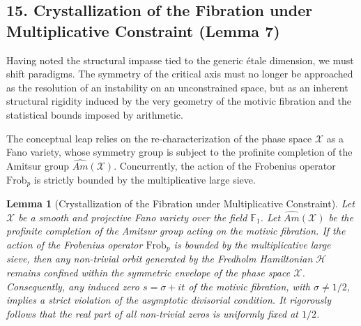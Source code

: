 \documentclass[
]{article}
\newtheorem{lemma}{Lemma}
\begin{document}
\subsection{15. Crystallization of the Fibration under Multiplicative Constraint (Lemma 7)}
Having noted the structural impasse tied to the generic étale dimension, we must shift paradigms. The symmetry of the critical axis must no longer be approached as the resolution of an instability on an unconstrained space, but as an inherent structural rigidity induced by the very geometry of the motivic fibration and the statistical bounds imposed by arithmetic.

The conceptual leap relies on the re-characterization of the phase space $\mathcal{X}$ as a Fano variety, whose symmetry group is subject to the profinite completion of the Amitsur group $\widehat{Am}(\mathcal{X})$. Concurrently, the action of the Frobenius operator $\mathrm{Frob}_p$ is strictly bounded by the multiplicative large sieve.

\begin{lemma}[Crystallization of the Fibration under Multiplicative Constraint]
    Let $\mathcal{X}$ be a smooth and projective Fano variety over the field $\mathbb{F}_1$. Let $\widehat{Am}(\mathcal{X})$ be the profinite completion of the Amitsur group acting on the motivic fibration. If the action of the Frobenius operator $\mathrm{Frob}_p$ is bounded by the multiplicative large sieve, then any non-trivial orbit generated by the Fredholm Hamiltonian $\mathcal{H}$ remains confined within the symmetric envelope of the phase space $\mathcal{X}$. Consequently, any induced zero $s = \sigma + it$ of the motivic fibration, with $\sigma \neq 1/2$, implies a strict violation of the asymptotic divisorial condition. It rigorously follows that the real part of all non-trivial zeros is uniformly fixed at $1/2$.
\end{lemma}
\end{document}

